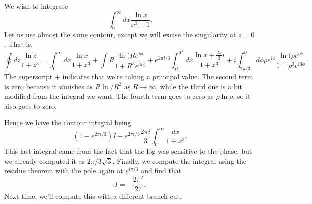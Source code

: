 \begin{exm}
    We wish to integrate
    \begin{equation}
        \int_0^\infty dx \frac{\ln x}{x^3+1}.
    \end{equation}
    Let us use almost the same contour, except we will excise the singularity at $z=0$. That is,
    \begin{equation}
        \oint dz \frac{\ln z}{1+z^3} = \int_0^\infty dx \frac{\ln x}{1+x^3} + \int R \frac{\ln (Re^{i\phi}}{1+R^3 e^{3i\phi}}+ e^{2\pi i /3} \int_R^{0^+} dx \frac{\ln x + \frac{2\pi}{3}i}{1+x^3} + i\int_{2\pi/3}^0 d\phi \rho e^{i\phi} \frac{\ln(\rho e^{i\phi}}{1+\rho^3 e^{i3\phi}}.
    \end{equation}
    The superscript $+$ indicates that we're taking a principal value. The second term is zero because it vanishes as $R\ln /R^2$ as $R\to \infty$, while the third one is a bit modified from the integral we want. The fourth term goes to zero as $\rho \ln \rho$, so it also goes to zero.
    
    Hence we have the contour integral being
    \begin{equation}
        (1-e^{2\pi i /3}) I - e^{2\pi i/3 } \frac{2\pi i}{3} \int_0^\infty \frac{dx}{1+x^3}.
    \end{equation}
    This last integral came from the fact that the log was sensitive to the phase, but we already computed it as $2\pi/3\sqrt{3}$. Finally, we compute the integral using the residue theorem with the pole again at $e^{i\pi/3}$ and find that
    \begin{equation}
        I= - \frac{2\pi^2}{27}.
    \end{equation}
    Next time, we'll compute this with a different branch cut.
\end{exm}
